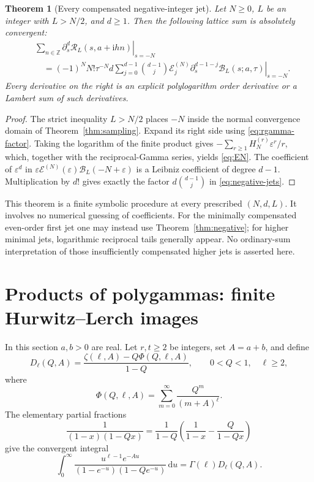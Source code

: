 \documentclass[11pt,a4paper]{article}
\numberwithin{equation}{section}
\newtheorem{theorem}{Theorem}[section]
\theoremstyle{definition}
\theoremstyle{remark}
\newcommand{\dd}{\,\mathrm d}
\newcommand{\ii}{\mathrm i}
\newcommand{\Z}{\mathbb Z}
\newcommand{\eps}{\varepsilon}
\newcommand{\Rcal}{\mathcal R}
\newcommand{\Bcal}{\mathcal B}
\newcommand{\Ecal}{\mathcal E}
\begin{document}
\begin{theorem}[Every compensated negative-integer jet]
\label{thm:negative-jets}
Let $N\ge0$, $L$ be an integer with $L>N/2$, and $d\ge1$.
Then the following lattice sum is absolutely convergent:
\begin{equation}\label{eq:negative-jets}
 \begin{split}
 &\sum_{n\in\Z}
       \left.\partial_s^d\Rcal_L(s,a+\ii hn)\right|_{s=-N}\\
 &\quad=(-1)^N N!\tau^{-N}d
       \sum_{j=0}^{d-1}\binom{d-1}{j}\Ecal_j^{(N)}
           \left.\partial_s^{d-1-j}\Bcal_L(s;a,\tau)\right|_{s=-N}.
 \end{split}
\end{equation}
Every derivative on the right is an explicit polylogarithm order
derivative or a Lambert sum of such derivatives.
\end{theorem}
\begin{proof}
The strict inequality $L>N/2$ places $-N$ inside the normal
convergence domain of Theorem~\ref{thm:sampling}. Expand its right
side using \eqref{eq:rgamma-factor}. Taking the logarithm of the
finite product gives $-\sum_{r\ge1}H_N^{(r)}\eps^r/r$, which,
together with the reciprocal-Gamma series, yields \eqref{eq:EN}.
The coefficient of $\eps^d$ in $\eps\Ecal^{(N)}(\eps)
\Bcal_L(-N+\eps)$ is a Leibniz coefficient of degree $d-1$.
Multiplication by $d!$ gives exactly the factor
$d\binom{d-1}{j}$ in \eqref{eq:negative-jets}.
\end{proof}

This theorem is a finite symbolic procedure at every prescribed
$(N,d,L)$. It involves no numerical guessing of coefficients.
For the minimally compensated even-order first jet one may instead
use Theorem~\ref{thm:negative}; for higher minimal jets, logarithmic
reciprocal tails generally appear. No ordinary-sum interpretation of
those insufficiently compensated higher jets is asserted here.

\section{Products of polygammas: finite Hurwitz--Lerch images}
\label{sec:bilinear}

In this section $a,b>0$ are real. Let $r,t\ge2$ be integers, set
$A=a+b$, and define
\begin{equation}\label{eq:D}
 D_\ell(Q,A)=\frac{\zeta(\ell,A)-Q\Phi(Q,\ell,A)}{1-Q},
 \qquad 0<Q<1,\quad \ell\ge2,
\end{equation}
where
\[
 \Phi(Q,\ell,A)=\sum_{m=0}^\infty\frac{Q^m}{(m+A)^\ell}.
\]
The elementary partial fractions
\begin{equation}\label{eq:denominator-pf}
 \frac1{(1-x)(1-Qx)}
   =\frac1{1-Q}\left(\frac1{1-x}-\frac{Q}{1-Qx}\right)
\end{equation}
give the convergent integral
\begin{equation}\label{eq:D-integral}
 \int_0^\infty\frac{u^{\ell-1}e^{-Au}}
               {(1-e^{-u})(1-Qe^{-u})}\dd u
        =\Gamma(\ell)D_\ell(Q,A).
\end{equation}
\end{document}
